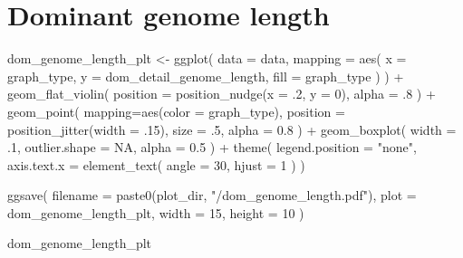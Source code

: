 \documentclass[
]{book}
\newenvironment{Shaded}{\begin{snugshade}}{\end{snugshade}}
\newcommand{\AttributeTok}[1]{\textcolor[rgb]{0.77,0.63,0.00}{#1}}
\newcommand{\ConstantTok}[1]{\textcolor[rgb]{0.00,0.00,0.00}{#1}}
\newcommand{\DecValTok}[1]{\textcolor[rgb]{0.00,0.00,0.81}{#1}}
\newcommand{\FloatTok}[1]{\textcolor[rgb]{0.00,0.00,0.81}{#1}}
\newcommand{\FunctionTok}[1]{\textcolor[rgb]{0.00,0.00,0.00}{#1}}
\newcommand{\NormalTok}[1]{#1}
\newcommand{\OtherTok}[1]{\textcolor[rgb]{0.56,0.35,0.01}{#1}}
\newcommand{\SpecialCharTok}[1]{\textcolor[rgb]{0.00,0.00,0.00}{#1}}
\newcommand{\StringTok}[1]{\textcolor[rgb]{0.31,0.60,0.02}{#1}}
\begin{document}
\hypertarget{dominant-genome-length}{%
\section{Dominant genome length}\label{dominant-genome-length}}

\begin{Shaded}
\begin{Highlighting}[]
\NormalTok{dom\_genome\_length\_plt }\OtherTok{\textless{}{-}} \FunctionTok{ggplot}\NormalTok{(}
    \AttributeTok{data =}\NormalTok{ data,}
    \AttributeTok{mapping =} \FunctionTok{aes}\NormalTok{(}
      \AttributeTok{x =}\NormalTok{ graph\_type,}
      \AttributeTok{y =}\NormalTok{ dom\_detail\_genome\_length,}
      \AttributeTok{fill =}\NormalTok{ graph\_type}
\NormalTok{    )}
\NormalTok{  ) }\SpecialCharTok{+}
  \FunctionTok{geom\_flat\_violin}\NormalTok{(}
    \AttributeTok{position =} \FunctionTok{position\_nudge}\NormalTok{(}\AttributeTok{x =}\NormalTok{ .}\DecValTok{2}\NormalTok{, }\AttributeTok{y =} \DecValTok{0}\NormalTok{),}
    \AttributeTok{alpha =}\NormalTok{ .}\DecValTok{8}
\NormalTok{  ) }\SpecialCharTok{+}
  \FunctionTok{geom\_point}\NormalTok{(}
    \AttributeTok{mapping=}\FunctionTok{aes}\NormalTok{(}\AttributeTok{color =}\NormalTok{ graph\_type),}
    \AttributeTok{position =} \FunctionTok{position\_jitter}\NormalTok{(}\AttributeTok{width =}\NormalTok{ .}\DecValTok{15}\NormalTok{),}
    \AttributeTok{size =}\NormalTok{ .}\DecValTok{5}\NormalTok{,}
    \AttributeTok{alpha =} \FloatTok{0.8}
\NormalTok{  ) }\SpecialCharTok{+}
  \FunctionTok{geom\_boxplot}\NormalTok{(}
    \AttributeTok{width =}\NormalTok{ .}\DecValTok{1}\NormalTok{,}
    \AttributeTok{outlier.shape =} \ConstantTok{NA}\NormalTok{,}
    \AttributeTok{alpha =} \FloatTok{0.5}
\NormalTok{  ) }\SpecialCharTok{+}
  \FunctionTok{theme}\NormalTok{(}
    \AttributeTok{legend.position =} \StringTok{"none"}\NormalTok{,}
    \AttributeTok{axis.text.x =} \FunctionTok{element\_text}\NormalTok{(}
      \AttributeTok{angle =} \DecValTok{30}\NormalTok{,}
      \AttributeTok{hjust =} \DecValTok{1}
\NormalTok{    )}
\NormalTok{  )}

\FunctionTok{ggsave}\NormalTok{(}
  \AttributeTok{filename =} \FunctionTok{paste0}\NormalTok{(plot\_dir, }\StringTok{"/dom\_genome\_length.pdf"}\NormalTok{),}
  \AttributeTok{plot =}\NormalTok{ dom\_genome\_length\_plt,}
  \AttributeTok{width =} \DecValTok{15}\NormalTok{,}
  \AttributeTok{height =} \DecValTok{10}
\NormalTok{)}

\NormalTok{dom\_genome\_length\_plt}
\end{Highlighting}
\end{Shaded}
\end{document}
